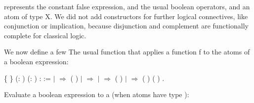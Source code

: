 represents the constant false expression,  and  the usual boolean operators, and  an atom of type \var X. We did not add constructors for further logical connectives, like conjunction or implication, because disjunction and complement are functionally complete for classical logic.

\medskip

We now define a few The usual  function that applies a function \var f to the atoms of a boolean expression:

\begin{coqdoccode}
\coqdocnoindent
{}  \{ \} (:   ) (: ) :  :=\coqdoceol
\coqdocnoindent
{}  \coqdoceol
\coqdocindent{1.00em}
\ensuremath{|}   \ensuremath{\Rightarrow}  ( )\coqdoceol
\coqdocindent{1.00em}
\ensuremath{|}  \ensuremath{\Rightarrow} \coqdoceol
\coqdocindent{1.00em}
\ensuremath{|}   \ensuremath{\Rightarrow}  (  )\coqdoceol
\coqdocindent{1.00em}
\ensuremath{|}    \ensuremath{\Rightarrow}  (  ) (  )\coqdoceol
\coqdocnoindent
{}.\coqdoceol
\coqdocemptyline
\end{coqdoccode}

Evaluate a boolean expression to a  
(when atoms have type ):

